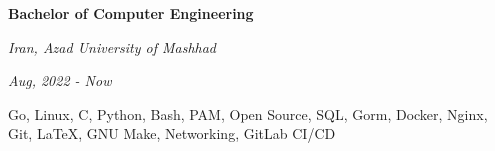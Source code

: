 \documentclass{engineercv}
\begin{document}
\begin{minipage}{\textwidth}
  \begin{multicols}{2}
    \begin{minipage}{0.5\textwidth}
      \textbf{Bachelor of Computer Engineering}

      \textit{Iran, Azad University of Mashhad}

      \textit{Aug, 2022 - Now}
    \end{minipage}
    \columnbreak
    \begin{minipage}{0.5\textwidth}
      Go, Linux, C, Python, Bash, PAM, Open Source,
      SQL, Gorm, Docker, Nginx, Git, \LaTeX, GNU Make,
      Networking, GitLab CI/CD
    \end{minipage}
  \end{multicols}
\end{minipage}
\end{document}
